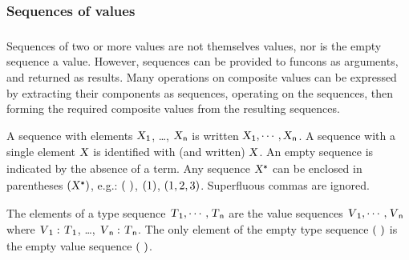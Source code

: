\subsubsection*{Sequences of values}\hypertarget{sequences-of-values}{}\label{sequences-of-values}

\begin{align*}
  [ ~ 
  \KEY{Funcon} ~ & \NAMEREF{length} \\
  \KEY{Funcon} ~ & \NAMEREF{index} \\
  \KEY{Funcon} ~ & \NAMEREF{is-in} \\
  \KEY{Funcon} ~ & \NAMEREF{first} \\
  \KEY{Funcon} ~ & \NAMEREF{second} \\
  \KEY{Funcon} ~ & \NAMEREF{third} \\
  \KEY{Funcon} ~ & \NAMEREF{first-n} \\
  \KEY{Funcon} ~ & \NAMEREF{drop-first-n} \\
  \KEY{Funcon} ~ & \NAMEREF{reverse} \\
  \KEY{Funcon} ~ & \NAMEREF{n-of} \\
  \KEY{Funcon} ~ & \NAMEREF{intersperse}
  ~ ]
\end{align*}
Sequences of two or more values are not themselves values, nor is the empty
  sequence a value. However, sequences can be provided to funcons as arguments,
  and returned as results. Many operations on composite values can be expressed
  by extracting their components as sequences, operating on the sequences, then
  forming the required composite values from the resulting sequences.

A sequence with elements $\SHADE{\VAR{X}\SUB{1}}$, \ldots{}, $\SHADE{\VAR{X}\SUB{n}}$ is written $\SHADE{\VAR{X}\SUB{1}, \cdots, \VAR{X}\SUB{n}}$.
  A sequence with a single element $\SHADE{\VAR{X}}$ is identified with (and written) $\SHADE{\VAR{X}}$.
  An empty sequence is indicated by the absence of a term.
  Any sequence $\SHADE{\VAR{X}\STAR}$ can be enclosed in parentheses $\SHADE{( \VAR{X}\STAR )}$, e.g.:
  $\strut(  ~  )\strut$, $\strut( 1 )\strut$, $\strut( 1,  
           2,  
           3 )\strut$. Superfluous commas are ignored.

The elements of a type sequence $\SHADE{\VAR{T}\SUB{1}, \cdots, \VAR{T}\SUB{n}}$ are the value sequences $\SHADE{\VAR{V}\SUB{1}, \cdots, \VAR{V}\SUB{n}}$
  where $\SHADE{\VAR{V}\SUB{1} : \VAR{T}\SUB{1}}$, \ldots{}, $\SHADE{\VAR{V}\SUB{n} : \VAR{T}\SUB{n}}$. The only element of the empty type sequence $\strut(  ~  )\strut$
  is the empty value sequence $\strut(  ~  )\strut$.

